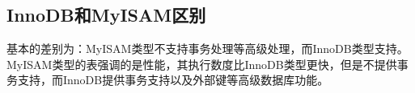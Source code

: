 \documentclass[../../../interview-questions.tex]{subfiles}
\begin{document}
\subsection{InnoDB和MyISAM区别}

基本的差别为：MyISAM类型不支持事务处理等高级处理，而InnoDB类型支持。MyISAM类型的表强调的是性能，其执行数度比InnoDB类型更快，但是不提供事务支持，而InnoDB提供事务支持以及外部键等高级数据库功能。
\end{document}
